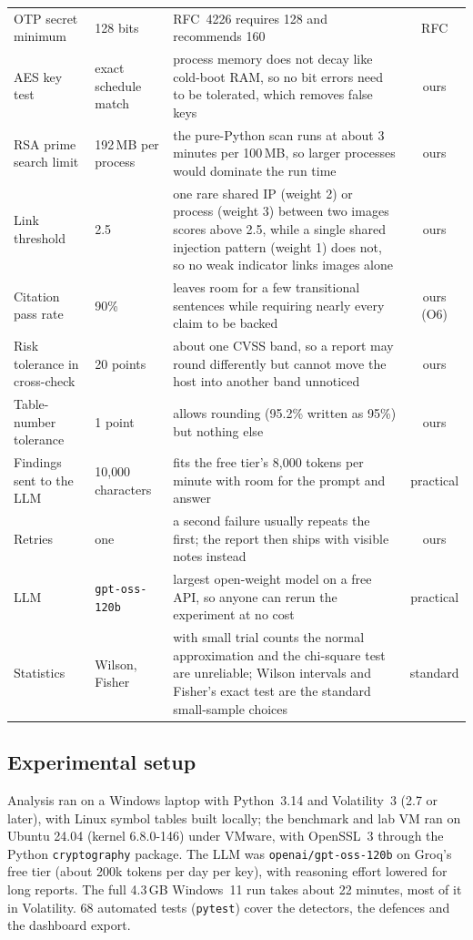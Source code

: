 \begin{table}[t]
\begin{tabularx}{\textwidth}{@{}p{37mm}p{26mm}Xc@{}}
OTP secret minimum & 128 bits & RFC~4226 requires 128 and recommends 160 & RFC\\
AES key test & exact schedule match & process memory does not decay like cold-boot RAM, so no bit errors need to be tolerated, which removes false keys & ours\\
RSA prime search limit & 192\,MB per process & the pure-Python scan runs at about 3 minutes per 100\,MB, so larger processes would dominate the run time & ours\\
Link threshold & 2.5 & one rare shared IP (weight 2) or process (weight 3) between two images scores above 2.5, while a single shared injection pattern (weight 1) does not, so no weak indicator links images alone & ours\\
Citation pass rate & 90\% & leaves room for a few transitional sentences while requiring nearly every claim to be backed & ours (O6)\\
Risk tolerance in cross-check & 20 points & about one CVSS band, so a report may round differently but cannot move the host into another band unnoticed & ours\\
Table-number tolerance & 1 point & allows rounding (95.2\% written as 95\%) but nothing else & ours\\
Findings sent to the LLM & 10{,}000 characters & fits the free tier's 8{,}000 tokens per minute with room for the prompt and answer & practical\\
Retries & one & a second failure usually repeats the first; the report then ships with visible notes instead & ours\\
LLM & \texttt{gpt-oss-120b} & largest open-weight model on a free API, so anyone can rerun the experiment at no cost & practical\\
Statistics & Wilson, Fisher & with small trial counts the normal approximation and the chi-square test are unreliable; Wilson intervals and Fisher's exact test are the standard small-sample choices & standard\\
\bottomrule
\end{tabularx}
\end{table}

\subsection{Experimental setup}
Analysis ran on a Windows laptop with Python~3.14 and Volatility~3 (2.7 or later), with Linux symbol tables
built locally; the benchmark and lab VM ran on Ubuntu 24.04 (kernel 6.8.0-146) under VMware, with OpenSSL~3
through the Python \texttt{cryptography} package. The LLM was \texttt{openai/gpt-oss-120b} on Groq's free tier
(about 200k tokens per day per key), with reasoning effort lowered for long reports. The full 4.3\,GB Windows~11
run takes about 22 minutes, most of it in Volatility. 68 automated tests (\texttt{pytest}) cover the detectors,
the defences and the dashboard export.

